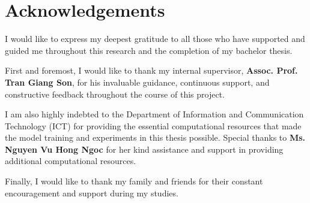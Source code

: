 \section*{Acknowledgements}

I would like to express my deepest gratitude to all those who have supported and guided me throughout this research and the completion of my bachelor thesis.

First and foremost, I would like to thank my internal supervisor, \textbf{Assoc. Prof. Tran Giang Son}, for his invaluable guidance, continuous support, and constructive feedback throughout the course of this project.

I am also highly indebted to the Department of Information and Communication Technology (ICT) for providing the essential computational resources that made the model training and experiments in this thesis possible. Special thanks to \textbf{Ms. Nguyen Vu Hong Ngoc} for her kind assistance and support in providing additional computational resources.

Finally, I would like to thank my family and friends for their constant encouragement and support during my studies.

\newpage
